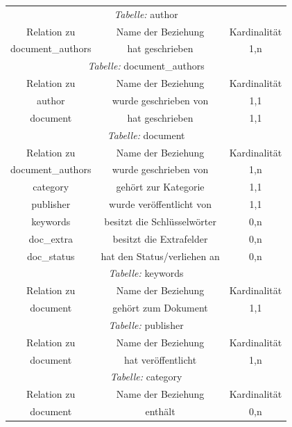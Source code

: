\begin{longtable}{@{}ccc@{}}
  \toprule
  \multicolumn{3}{c}{\emph{Tabelle:} author} \\
  Relation zu & Name der Beziehung & Kardinalität \\
  \cmidrule(lr){1-1}\cmidrule(lr){2-2}\cmidrule(lr){3-3}
  document\_authors & hat geschrieben & 1,n \\
  
  \toprule
  \multicolumn{3}{c}{\emph{Tabelle:} document\_authors} \\
  Relation zu & Name der Beziehung & Kardinalität \\
  \cmidrule(lr){1-1}\cmidrule(lr){2-2}\cmidrule(lr){3-3}
  author & wurde geschrieben von & 1,1 \\
  document & hat geschrieben & 1,1\\

  \toprule
  \multicolumn{3}{c}{\emph{Tabelle:} document} \\
  Relation zu & Name der Beziehung & Kardinalität \\
  \cmidrule(lr){1-1}\cmidrule(lr){2-2}\cmidrule(lr){3-3}
  document\_authors & wurde geschrieben von & 1,n\\
  category & gehört zur Kategorie & 1,1\\
  publisher & wurde veröffentlicht von & 1,1\\
  keywords & besitzt die Schlüsselwörter & 0,n\\  
  doc\_extra & besitzt die Extrafelder & 0,n\\
  doc\_status & hat den Status/verliehen an & 0,n\\

  \toprule
  \multicolumn{3}{c}{\emph{Tabelle:} keywords} \\
  Relation zu & Name der Beziehung & Kardinalität \\
  \cmidrule(lr){1-1}\cmidrule(lr){2-2}\cmidrule(lr){3-3}
  document & gehört zum Dokument & 1,1 \\

  \toprule
  \multicolumn{3}{c}{\emph{Tabelle:} publisher} \\
  Relation zu & Name der Beziehung & Kardinalität \\
  \cmidrule(lr){1-1}\cmidrule(lr){2-2}\cmidrule(lr){3-3}
  document & hat veröffentlicht & 1,n \\

  \toprule
  \multicolumn{3}{c}{\emph{Tabelle:} category} \\
  Relation zu & Name der Beziehung & Kardinalität \\
  \cmidrule(lr){1-1}\cmidrule(lr){2-2}\cmidrule(lr){3-3}
  document & enthält & 0,n \\


\end{longtable}
